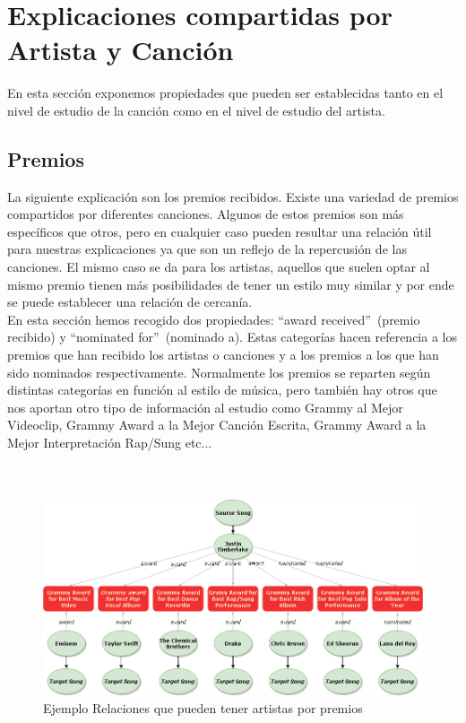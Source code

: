 \section{Explicaciones compartidas por Artista y Canción}

En esta sección exponemos propiedades que pueden ser establecidas tanto en el nivel de estudio de la canción como en el nivel de estudio del artista.

\subsection*{Premios}

La siguiente explicación son los premios recibidos. Existe una variedad de premios compartidos por diferentes canciones. Algunos de estos premios son más específicos que otros, pero en cualquier caso pueden resultar una relación útil para nuestras explicaciones ya que son un reflejo de la repercusión de las canciones. El mismo caso se da para los artistas, aquellos que suelen optar al mismo premio tienen más posibilidades de tener un estilo muy similar y por ende se puede establecer una relación de cercanía.\\

En esta sección hemos recogido dos propiedades: ``award received''~(premio recibido) y ``nominated for''~(nominado a). Estas categorías hacen referencia a los premios que han recibido los artistas o canciones y a los premios a los que han sido nominados respectivamente. Normalmente los premios se reparten según distintas categorías en función al estilo de música, pero también hay otros que nos aportan otro tipo de información al estudio como Grammy al Mejor Videoclip, Grammy Award a la Mejor Canción Escrita, Grammy Award a la Mejor Interpretación Rap/Sung etc...\\\\\\

\begin{figure}[h!]
	\centering
	\includegraphics[width = 1\textwidth]{Imagenes/Bitmap/awads.png}
	\caption{Ejemplo Relaciones que pueden tener artistas por premios}
	\label{fig:sampleImage}
\end{figure}

